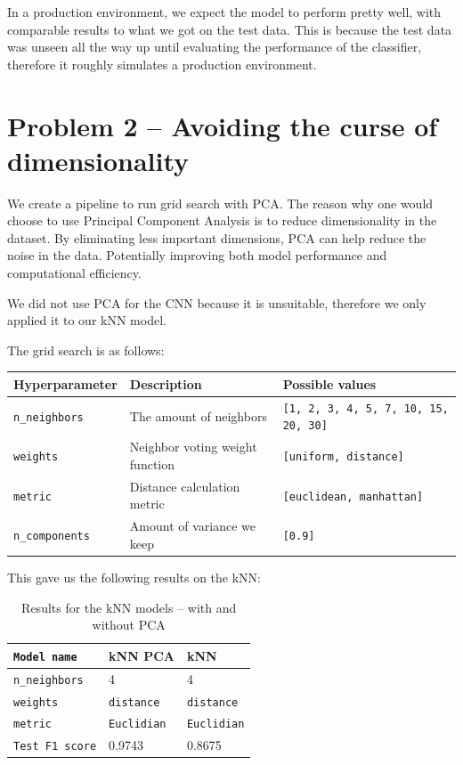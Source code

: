 \documentclass{article}
\begin{document}
In a production environment, we expect the model to perform pretty well, with comparable results to what we got on the test data. This is because the test data was unseen all the way up until evaluating the performance of the classifier, therefore it roughly simulates a production environment. 

\section{Problem 2 – Avoiding the curse of dimensionality}

We create a pipeline to run grid search with PCA. The reason why one would choose to use Principal Component Analysis is to reduce dimensionality in the dataset. By eliminating less important dimensions, PCA can help reduce the noise in the data. Potentially improving both model performance and computational efficiency.

We did not use PCA for the CNN because it is unsuitable, therefore we only applied it to our kNN model.

The grid search is as follows:

\begin{table}[ht]
    \centering
    \begin{tabular}{|l|l|l|}
        \hline
        \textbf{Hyperparameter} & \textbf{Description}  & \textbf{Possible values} \\
        \hline
        \texttt{n\_neighbors} & The amount of neighbors & \texttt{[1, 2, 3, 4, 5, 7, 10, 15, 20, 30]} \\
        \hline
        \texttt{weights} & Neighbor voting weight function & \texttt{[uniform, distance]} \\

        \hline
        \texttt{metric} & Distance calculation metric & \texttt{[euclidean, manhattan]} \\
        \hline
        
        \texttt{n\_components} & Amount of variance we keep & \texttt{[0.9]} \\
        \hline
    \end{tabular}
\end{table}

This gave us the following results on the kNN:

\begin{table}[ht]
    \centering
    \begin{tabular}{|l|l|l|}
        \hline
        \texttt{Model name} & \textbf{kNN PCA} & \textbf{kNN} \\
        \hline
        \texttt{n\_neighbors} & 4 & 4\\
        \hline
        \texttt{weights} & \texttt{distance} & \texttt{distance} \\
        \hline
        \texttt{metric} & \texttt{Euclidian} & \texttt{Euclidian} \\  
        \hline
        \texttt{Test F1 score} & 0.9743 & 0.8675 \\  
        \hline
    \end{tabular}
    \caption{Results for the kNN models – with and without PCA}
\end{table}
\end{document}
